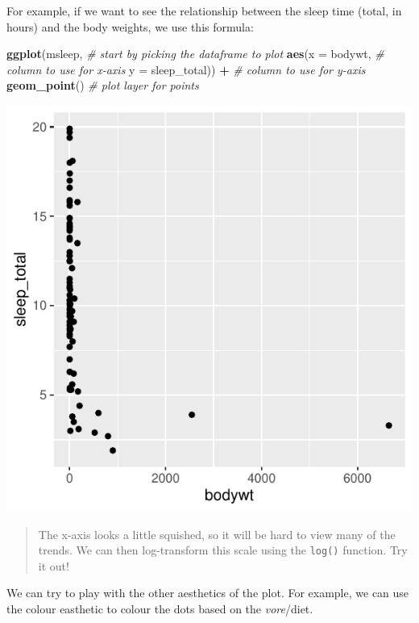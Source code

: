 \documentclass[
]{book}
\newenvironment{Shaded}{\begin{snugshade}}{\end{snugshade}}
\newcommand{\AttributeTok}[1]{\textcolor[rgb]{0.13,0.29,0.53}{#1}}
\newcommand{\CommentTok}[1]{\textcolor[rgb]{0.56,0.35,0.01}{\textit{#1}}}
\newcommand{\FunctionTok}[1]{\textcolor[rgb]{0.13,0.29,0.53}{\textbf{#1}}}
\newcommand{\NormalTok}[1]{#1}
\newcommand{\SpecialCharTok}[1]{\textcolor[rgb]{0.81,0.36,0.00}{\textbf{#1}}}
\begin{document}
For example, if we want to see the relationship between the sleep time (total, in hours) and the body weights, we use this formula:

\begin{Shaded}
\begin{Highlighting}[]
\FunctionTok{ggplot}\NormalTok{(msleep,                    }\CommentTok{\# start by picking the dataframe to plot}
       \FunctionTok{aes}\NormalTok{(}\AttributeTok{x =}\NormalTok{ bodywt,            }\CommentTok{\# column to use for x{-}axis}
           \AttributeTok{y =}\NormalTok{ sleep\_total)) }\SpecialCharTok{+}    \CommentTok{\# column to use for y{-}axis}
  \FunctionTok{geom\_point}\NormalTok{()                    }\CommentTok{\# plot layer for points}
\end{Highlighting}
\end{Shaded}

\includegraphics{_main_files/figure-latex/unnamed-chunk-19-1.pdf}

\begin{quote}
The x-axis looks a little squished, so it will be hard to view many of the trends.
We can then log-transform this scale using the \texttt{log()} function.
Try it out!
\end{quote}

We can try to play with the other aesthetics of the plot.
For example, we can use the colour easthetic to colour the dots based on the \emph{vore}/diet.
\end{document}

